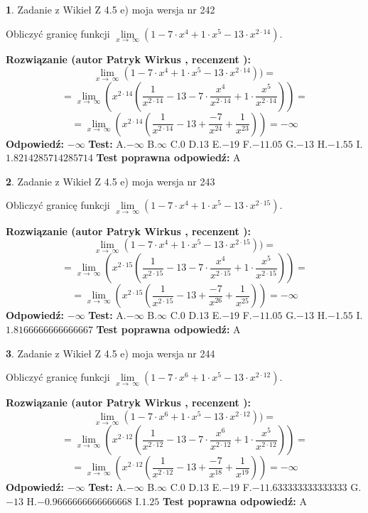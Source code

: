 \documentclass[12pt, a4paper]{article}
\theoremstyle{definition} %
\newtheorem{zad}{}
\newcommand{\zadStart}[1]{\begin{zad}#1\newline}
\newcommand{\zadStop}{\end{zad}}
\newcommand{\rozwStart}[2]{\noindent \textbf{Rozwiązanie (autor #1 , recenzent #2): }\newline}
\newcommand{\rozwStop}{\newline}
\newcommand{\odpStart}{\noindent \textbf{Odpowiedź:}\newline}
\newcommand{\odpStop}{\newline}
\newcommand{\testStart}{\noindent \textbf{Test:}\newline}
\newcommand{\testStop}{\newline}
\newcommand{\kluczStart}{\noindent \textbf{Test poprawna odpowiedź:}\newline}
\newcommand{\kluczStop}{\newline}
\begin{document}
\zadStart{Zadanie z Wikieł Z 4.5 e) moja wersja nr 242}


Obliczyć granicę funkcji  $\lim\limits_{x\to\ \infty}(1 - 7 \cdot x^{4}+1 \cdot x^{5}- 13 \cdot x^{2\cdot14})$.
\zadStop
\rozwStart{Patryk Wirkus}{}
$$\lim\limits_{x\to\ \infty}(1 - 7 \cdot x^{4}+1 \cdot x^{5}- 13 \cdot x^{2\cdot14}))=$$
$$=\lim\limits_{x\to\ \infty}(x^{2\cdot14}(\frac{1}{x^{2\cdot14}}-13 -7 \cdot \frac{x^{4}}{x^{2\cdot14}}+1 \cdot \frac{x^{5}}{x^{2\cdot14}}))=$$
$$=\lim\limits_{x\to\ \infty}(x^{2\cdot14}(\frac{1}{x^{2\cdot14}}-13 + \frac{-7}{x^{24}}+ \frac{1}{x^{23}}))=-\infty$$
\rozwStop
\odpStart
$-\infty$
\odpStop
\testStart
A.$-\infty$ B.$\infty$ C.$0$ D.$13$ E.$-19$
F.$-11.05$ G.$-13$
H.$-1.55$
I.$1.8214285714285714$
\testStop
\kluczStart
A
\kluczStop



\zadStart{Zadanie z Wikieł Z 4.5 e) moja wersja nr 243}


Obliczyć granicę funkcji  $\lim\limits_{x\to\ \infty}(1 - 7 \cdot x^{4}+1 \cdot x^{5}- 13 \cdot x^{2\cdot15})$.
\zadStop
\rozwStart{Patryk Wirkus}{}
$$\lim\limits_{x\to\ \infty}(1 - 7 \cdot x^{4}+1 \cdot x^{5}- 13 \cdot x^{2\cdot15}))=$$
$$=\lim\limits_{x\to\ \infty}(x^{2\cdot15}(\frac{1}{x^{2\cdot15}}-13 -7 \cdot \frac{x^{4}}{x^{2\cdot15}}+1 \cdot \frac{x^{5}}{x^{2\cdot15}}))=$$
$$=\lim\limits_{x\to\ \infty}(x^{2\cdot15}(\frac{1}{x^{2\cdot15}}-13 + \frac{-7}{x^{26}}+ \frac{1}{x^{25}}))=-\infty$$
\rozwStop
\odpStart
$-\infty$
\odpStop
\testStart
A.$-\infty$ B.$\infty$ C.$0$ D.$13$ E.$-19$
F.$-11.05$ G.$-13$
H.$-1.55$
I.$1.8166666666666667$
\testStop
\kluczStart
A
\kluczStop



\zadStart{Zadanie z Wikieł Z 4.5 e) moja wersja nr 244}


Obliczyć granicę funkcji  $\lim\limits_{x\to\ \infty}(1 - 7 \cdot x^{6}+1 \cdot x^{5}- 13 \cdot x^{2\cdot12})$.
\zadStop
\rozwStart{Patryk Wirkus}{}
$$\lim\limits_{x\to\ \infty}(1 - 7 \cdot x^{6}+1 \cdot x^{5}- 13 \cdot x^{2\cdot12}))=$$
$$=\lim\limits_{x\to\ \infty}(x^{2\cdot12}(\frac{1}{x^{2\cdot12}}-13 -7 \cdot \frac{x^{6}}{x^{2\cdot12}}+1 \cdot \frac{x^{5}}{x^{2\cdot12}}))=$$
$$=\lim\limits_{x\to\ \infty}(x^{2\cdot12}(\frac{1}{x^{2\cdot12}}-13 + \frac{-7}{x^{18}}+ \frac{1}{x^{19}}))=-\infty$$
\rozwStop
\odpStart
$-\infty$
\odpStop
\testStart
A.$-\infty$ B.$\infty$ C.$0$ D.$13$ E.$-19$
F.$-11.633333333333333$ G.$-13$
H.$-0.9666666666666668$
I.$1.25$
\testStop
\kluczStart
A
\kluczStop
\end{document}
